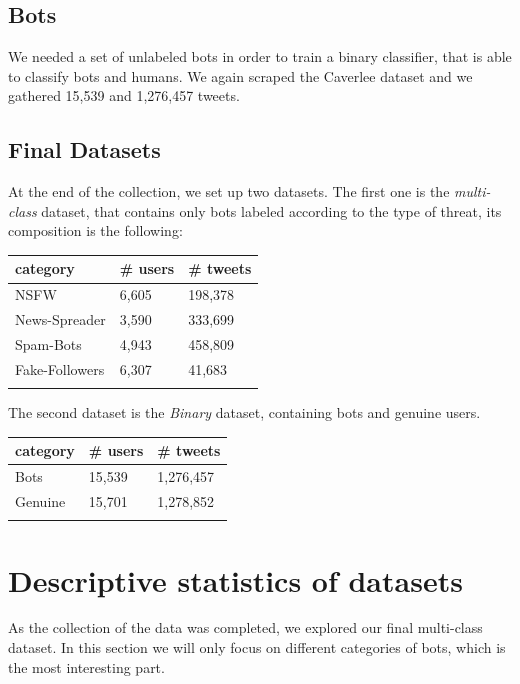 \subsection{Bots}
We needed a set of unlabeled bots in order to train a binary classifier, that is able to classify bots and humans. We again scraped the Caverlee dataset \cite{Lee11sevenmonths} and we gathered 15,539 and 1,276,457 tweets.

\subsection{Final Datasets}
\label{sec:dataset}
At the end of the collection, we set up two datasets. The first one is the \textit{multi-class} dataset, that contains only bots labeled according to the type of threat, its composition is the following:

\begin{center}
\begin{tabular}{lll}
	\\category&\# users&\# tweets\\
	\hline\hline
	NSFW&6,605&198,378\\
	News-Spreader&3,590&333,699\\
	Spam-Bots&4,943&458,809\\
	Fake-Followers&6,307&41,683\\\hline\\	
\end{tabular}
\end{center}

The second dataset is the \textit{Binary} dataset, containing bots and genuine users.

\begin{center}
	\begin{tabular}{lll}
		\\category&\# users&\# tweets\\
		\hline\hline
		Bots&15,539&1,276,457\\
		Genuine&15,701&1,278,852\\\hline\\	
	\end{tabular}
\end{center}

\newpage
\section{Descriptive statistics of datasets}
As the collection of the data was completed, we explored our final multi-class dataset. In this section we will only focus on different categories of bots, which is the most interesting part.

